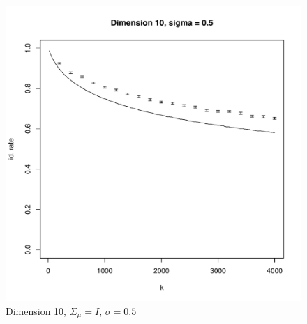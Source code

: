 \documentclass[11pt]{article}
\begin{document}
\begin{figure}
\centering
\includegraphics[scale = 0.6]{plot1_10.pdf}
\caption{Dimension 10, $\Sigma_\mu = I$, $\sigma = 0.5$}
\end{figure}
\end{document}
